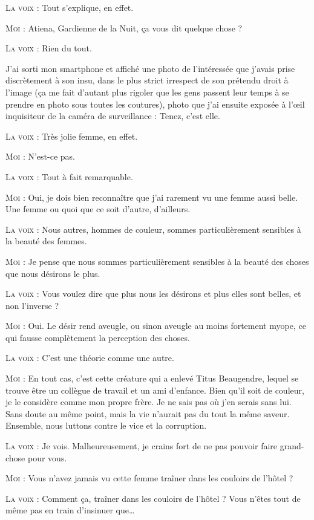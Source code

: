 \begin{dialogue}
\textsc{La voix} : Tout s’explique, en effet.

\textsc{Moi} : Atiena, Gardienne de la Nuit, ça vous dit quelque chose ?

\textsc{La voix} : Rien du tout.

J’ai sorti mon smartphone et affiché une photo de l’intéressée que j’avais prise discrètement à son insu, dans le plus strict irrespect de son prétendu droit à l’image (ça me fait d’autant plus rigoler que les gens passent leur temps à se prendre en photo sous toutes les coutures), photo que j’ai ensuite exposée à l’œil inquisiteur de la caméra de surveillance : Tenez, c’est elle.

\textsc{La voix} : Très jolie femme, en effet.

\textsc{Moi} : N’est-ce pas.

\textsc{La voix} : Tout à fait remarquable.

\textsc{Moi} : Oui, je dois bien reconnaître que j’ai rarement vu une femme aussi belle. Une femme ou quoi que ce soit d’autre, d’ailleurs.

\textsc{La voix} : Nous autres, hommes de couleur, sommes particulièrement sensibles à la beauté des femmes.

\textsc{Moi} : Je pense que nous sommes particulièrement sensibles à la beauté des choses que nous désirons le plus.

\textsc{La voix} : Vous voulez dire que plus nous les désirons et plus elles sont belles, et non l’inverse ?

\textsc{Moi} : Oui. Le désir rend aveugle, ou sinon aveugle au moins fortement myope, ce qui fausse complètement la perception des choses.

\textsc{La voix} : C’est une théorie comme une autre.

\textsc{Moi} : En tout cas, c’est cette créature qui a enlevé Titus Beaugendre, lequel se trouve être un collègue de travail et un ami d’enfance. Bien qu’il soit de couleur, je le considère comme mon propre frère. Je ne sais pas où j’en serais sans lui. Sans doute au même point, mais la vie n’aurait pas du tout la même saveur. Ensemble, nous luttons contre le vice et la corruption.

\textsc{La voix} : Je vois. Malheureusement, je crains fort de ne pas pouvoir faire grand-chose pour vous.

\textsc{Moi} : Vous n’avez jamais vu cette femme traîner dans les couloirs de l’hôtel ?

\textsc{La voix} : Comment ça, traîner dans les couloirs de l’hôtel ? Vous n’êtes tout de même pas en train d’insinuer que…


\end{dialogue}
